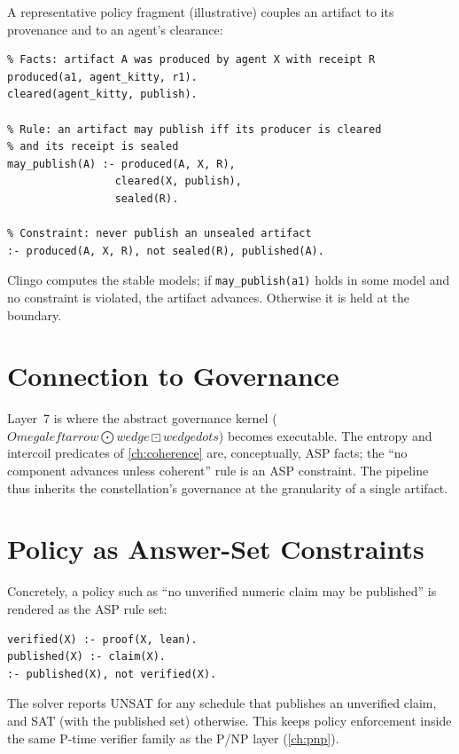 
A representative policy fragment (illustrative) couples an artifact to its
provenance and to an agent's clearance:
\begin{verbatim}
% Facts: artifact A was produced by agent X with receipt R
produced(a1, agent_kitty, r1).
cleared(agent_kitty, publish).

% Rule: an artifact may publish iff its producer is cleared
% and its receipt is sealed
may_publish(A) :- produced(A, X, R),
                 cleared(X, publish),
                 sealed(R).

% Constraint: never publish an unsealed artifact
:- produced(A, X, R), not sealed(R), published(A).
\end{verbatim}
Clingo computes the stable models; if \texttt{may\_publish(a1)} holds in some
model and no constraint is violated, the artifact advances. Otherwise it is
held at the boundary.

\section{Connection to Governance}
\label{sec:policy-gov}

Layer~7 is where the abstract governance kernel ($\ensuremath{Omega}\ensuremath{leftarrow}
\bigodot\ensuremath{wedge}\boxdot\ensuremath{wedge}\ensuremath{dots}$) becomes executable. The entropy and
intercoil predicates of \cref{ch:coherence} are, conceptually, ASP facts; the
``no component advances unless coherent'' rule is an ASP constraint. The
pipeline thus inherits the constellation's governance at the granularity of a
single artifact.

\section{Policy as Answer-Set Constraints}
\label{sec:policy-asp}

Concretely, a policy such as ``no unverified numeric claim may be
published'' is rendered as the ASP rule set:
\begin{verbatim}
verified(X) :- proof(X, lean).
published(X) :- claim(X).
:- published(X), not verified(X).
\end{verbatim}
The solver reports UNSAT for any schedule that publishes an unverified
claim, and SAT (with the published set) otherwise. This keeps policy
enforcement inside the same P-time verifier family as the P/NP layer
(\cref{ch:pnp}).
